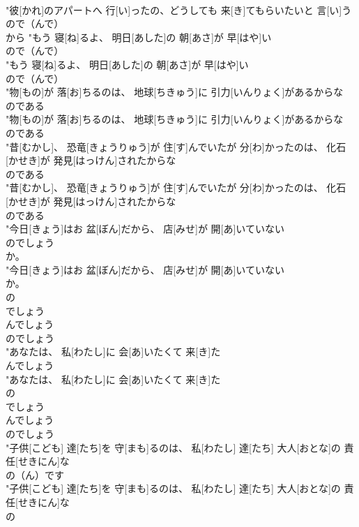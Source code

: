 \documentclass[8pt]{extreport}
\begin{document}
\begin{CJK}{UTF8}{min}
\\	"彼[かれ]のアパートへ 行[い]ったの、どうしても 来[き]てもらいたいと 言[い]う
\\	ので（んで）
\\	から	"もう 寝[ね]るよ、 明日[あした]の 朝[あさ]が 早[はや]い
\\	ので（んで）
\\	"もう 寝[ね]るよ、 明日[あした]の 朝[あさ]が 早[はや]い
\\	ので（んで）
\\	"物[もの]が 落[お]ちるのは、 地球[ちきゅう]に 引力[いんりょく]があるからな
\\	のである
\\	"物[もの]が 落[お]ちるのは、 地球[ちきゅう]に 引力[いんりょく]があるからな
\\	のである
\\	"昔[むかし]、 恐竜[きょうりゅう]が 住[す]んでいたが 分[わ]かったのは、 化石[かせき]が 発見[はっけん]されたからな
\\	のである
\\	"昔[むかし]、 恐竜[きょうりゅう]が 住[す]んでいたが 分[わ]かったのは、 化石[かせき]が 発見[はっけん]されたからな
\\	のである
\\	"今日[きょう]はお 盆[ぼん]だから、 店[みせ]が 開[あ]いていない
\\	のでしょう
\\	か。
\\	"今日[きょう]はお 盆[ぼん]だから、 店[みせ]が 開[あ]いていない
\\	か。
\\	の 
\\	でしょう 
\\	んでしょう	
\\	のでしょう
\\	"あなたは、 私[わたし]に 会[あ]いたくて 来[き]た
\\	んでしょう
\\	"あなたは、 私[わたし]に 会[あ]いたくて 来[き]た
\\	の 
\\	でしょう 
\\	んでしょう	
\\	のでしょう
\\	"子供[こども] 達[たち]を 守[まも]るのは、 私[わたし] 達[たち] 大人[おとな]の 責任[せきにん]な
\\	の（ん）です
\\	"子供[こども] 達[たち]を 守[まも]るのは、 私[わたし] 達[たち] 大人[おとな]の 責任[せきにん]な
\\	の 

\end{CJK}
\end{document}
